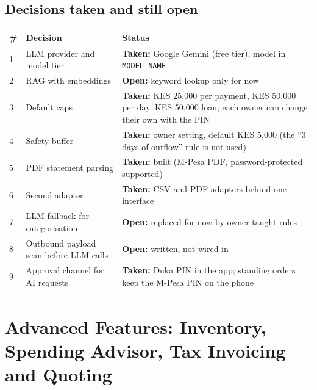 \documentclass[10pt,a4paper]{article}
\newcommand{\code}[1]{\texttt{\small #1}}
\begin{document}
\subsection{Decisions taken and still open}
\begin{center}
\begin{tabularx}{\textwidth}{@{}p{0.9cm}p{5.6cm}Y@{}}
\toprule
\textbf{\#} & \textbf{Decision} & \textbf{Status}\\
 & LLM provider and model tier & \textbf{Taken:} Google Gemini (free tier), model in \code{MODEL\_NAME}\\
2 & RAG with embeddings & \textbf{Open:} keyword lookup only for now\\
3 & Default caps & \textbf{Taken:} KES 25{,}000 per payment, KES 50{,}000 per day, KES 50{,}000 loan; each owner can change their own with the PIN\\
4 & Safety buffer & \textbf{Taken:} owner setting, default KES 5{,}000 (the ``3 days of outflow'' rule is not used)\\
5 & PDF statement parsing & \textbf{Taken:} built (M-Pesa PDF, password-protected supported)\\
6 & Second adapter & \textbf{Taken:} CSV and PDF adapters behind one interface\\
7 & LLM fallback for categorisation & \textbf{Open:} replaced for now by owner-taught rules\\
8 & Outbound payload scan before LLM calls & \textbf{Open:} written, not wired in\\
9 & Approval channel for AI requests & \textbf{Taken:} Duka PIN in the app; standing orders keep the M-Pesa PIN on the phone\\
\bottomrule
\end{tabularx}
\end{center}

\section{Advanced Features: Inventory, Spending Advisor, Tax Invoicing and Quoting}
\label{sec:advanced}
\end{document}
